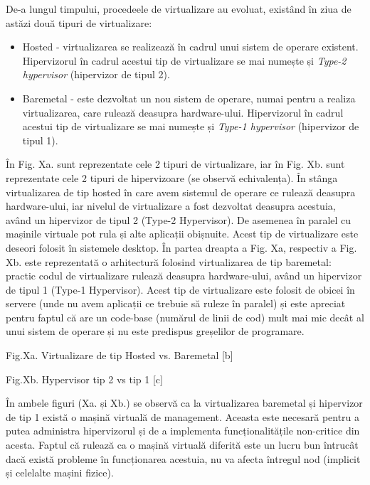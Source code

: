 De-a lungul timpului, procedeele de virtualizare au evoluat, existând în ziua de
astăzi două tipuri de virtualizare:

\begin{itemize}
	\item Hosted - virtualizarea se realizează în cadrul unui sistem de
		operare existent. Hipervizorul în cadrul acestui tip de
		virtualizare se mai numește și \textit{Type-2 hypervisor}
		(hipervizor de tipul 2).
	\item Baremetal - este dezvoltat un nou sistem de operare, numai pentru
		a realiza virtualizarea, care rulează deasupra hardware-ului.
		Hipervizorul în cadrul acestui tip de virtualizare se mai
		numește și \textit{Type-1 hypervisor} (hipervizor de tipul 1).
\end{itemize}

În Fig. Xa. sunt reprezentate cele 2 tipuri de virtualizare, iar în Fig. Xb.
sunt reprezentate cele 2 tipuri de hipervizoare (se observă echivalența). În
stânga virtualizarea de tip hosted în care avem sistemul de operare ce rulează
deasupra hardware-ului, iar nivelul de virtualizare a fost dezvoltat deasupra
acestuia, având un hipervizor de tipul 2 (Type-2 Hypervisor). De asemenea în
paralel cu mașinile virtuale pot rula și alte aplicații obișnuite. Acest tip de
virtualizare este deseori folosit în sistemele desktop. În partea dreapta a Fig.
Xa, respectiv a Fig. Xb. este reprezentată o arhitectură folosind virtualizarea
de tip baremetal: practic codul de virtualizare rulează deasupra hardware-ului,
având un hipervizor de tipul 1 (Type-1 Hypervisor). Acest tip de virtualizare
este folosit de obicei în servere (unde nu avem aplicații ce trebuie să ruleze
în paralel) și este apreciat pentru faptul că are un code-base (numărul de linii
de cod) mult mai mic decât al unui sistem de operare și nu este predispus
greșelilor de programare.

Fig.Xa. Virtualizare de tip Hosted vs. Baremetal [b]

Fig.Xb. Hypervisor tip 2 vs tip 1 [c]

În ambele figuri (Xa. și Xb.) se observă ca la virtualizarea baremetal și
hipervizor de tip 1 există o mașină virtuală de management. Aceasta este
necesară pentru a putea administra hipervizorul și de a implementa
funcționalitățile non-critice din acesta. Faptul că rulează ca o mașină virtuală
diferită este un lucru bun întrucât dacă există probleme în funcționarea
acestuia, nu va afecta întregul nod (implicit și celelalte mașini fizice).

